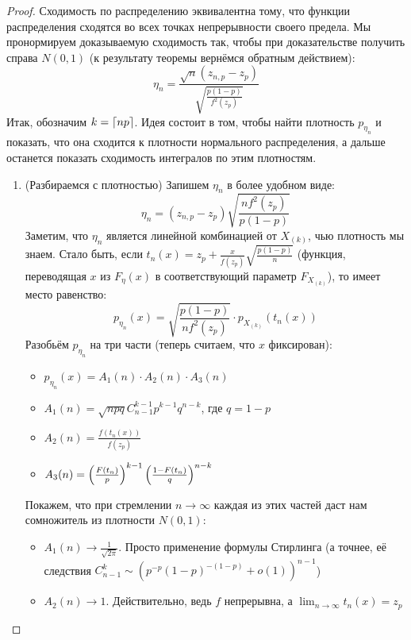 \begin{proof}
	Сходимость по распределению эквивалентна тому, что функции распределения сходятся во всех точках непрерывности своего предела. Мы пронормируем доказываемую сходимость так, чтобы при доказательстве получить справа $N(0, 1)$ (к результату теоремы вернёмся обратным действием):
	\[
		\eta_n = \frac{\sqrt{n}(z_{n, p} - z_p)}{\sqrt{\frac{p(1 - p)}{f^2(z_p)}}}
	\]
	Итак, обозначим $k = \left\lceil np\right\rceil$. Идея состоит в том, чтобы найти плотность $p_{\eta_n}$ и показать, что она сходится к плотности нормального распределения, а дальше останется показать сходимость интегралов по этим плотностям.
	\begin{enumerate}
		\item (Разбираемся с плотностью) Запишем $\eta_n$ в более удобном виде:
		\[
			\eta_n = (z_{n, p} - z_p)\sqrt{\frac{nf^2(z_p)}{p(1 - p)}}
		\]
		Заметим, что $\eta_n$ является линейной комбинацией от $X_{(k)}$, чью плотность мы знаем. Стало быть, если $t_n(x) = z_p + \frac{x}{f(z_p)}\sqrt{\frac{p(1 - p)}{n}}$ (функция, переводящая $x$ из $F_\eta(x)$ в соответствующий параметр $F_{X_{(k)}}$), то имеет место равенство:
		\[
			p_{\eta_n}(x) = \sqrt{\frac{p(1 - p)}{nf^2(z_p)}} \cdot p_{X_{(k)}}(t_n(x))
		\]
		Разобьём $p_{\eta_n}$ на три части (теперь считаем, что $x$ фиксирован):
		\begin{itemize}
			\item $p_{\eta_n}(x) = A_1(n) \cdot A_2(n) \cdot A_3(n)$
			
			\item $A_1(n) = \sqrt{npq}C_{n - 1}^{k - 1}p^{k - 1}q^{n - k}$, где $q = 1 - p$
			
			\item $A_2(n) = \frac{f(t_n(x))}{f(z_p)}$
			
			\item $A_3(n) = \left(\frac{F(t_n)}{p}\right)^{k - 1}\left(\frac{1 - F(t_n)}{q}\right)^{n - k}$
		\end{itemize}
		Покажем, что при стремлении $n \to \infty$ каждая из этих частей даст нам сомножитель из плотности $N(0, 1)$:
		\begin{itemize}
			\item $A_1(n) \to \frac{1}{\sqrt{2\pi}}$. Просто применение формулы Стирлинга (а точнее, её следствия $C_{n - 1}^k \sim (p^{-p}(1 - p)^{-(1 - p)} + o(1))^{n - 1}$)
			
			\item $A_2(n) \to 1$. Действительно, ведь $f$ непрерывна, а $\lim_{n \to \infty} t_n(x) = z_p$
			

\end{itemize}
\end{enumerate}
\end{proof}
